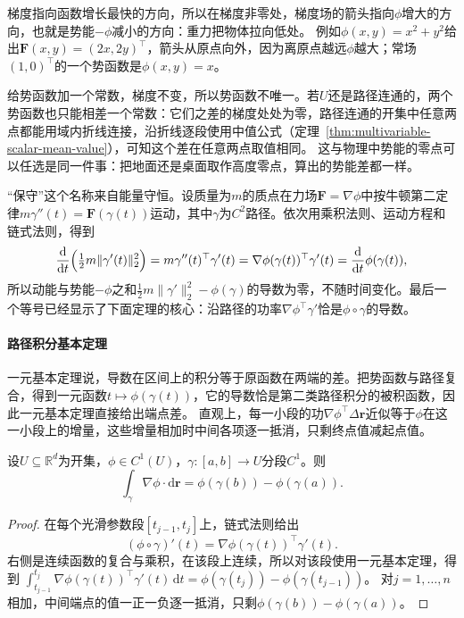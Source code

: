 梯度指向函数增长最快的方向，所以在梯度非零处，梯度场的箭头指向$\phi$增大的方向，也就是势能$-\phi$减小的方向：重力把物体拉向低处。
例如$\phi(x,y)=x^2+y^2$给出$\bm F(x,y)=(2x,2y)^\top$，箭头从原点向外，因为离原点越远$\phi$越大；常场$(1,0)^\top$的一个势函数是$\phi(x,y)=x$。

给势函数加一个常数，梯度不变，所以势函数不唯一。若$U$还是路径连通的，两个势函数也只能相差一个常数：它们之差的梯度处处为零，路径连通的开集中任意两点都能用域内折线连接，沿折线逐段使用中值公式（定理~\ref{thm:multivariable-scalar-mean-value}），可知这个差在任意两点取值相同。
这与物理中势能的零点可以任选是同一件事：把地面还是桌面取作高度零点，算出的势能差都一样。

“保守”这个名称来自能量守恒。设质量为$m$的质点在力场$\bm F=\nabla\phi$中按牛顿第二定律$m\gamma''(t)=\bm F(\gamma(t))$运动，其中$\gamma$为$C^2$路径。依次用乘积法则、运动方程和链式法则，得到
\[
 \frac{\mathrm d}{\mathrm dt}\Bigl(\tfrac12m\lVert\gamma'(t)\rVert_2^2\Bigr)
 =m\gamma''(t)^\top\gamma'(t)=\nabla\phi(\gamma(t))^\top\gamma'(t)
 =\frac{\mathrm d}{\mathrm dt}\phi(\gamma(t)),
\]
所以动能与势能$-\phi$之和$\frac12m\lVert\gamma'\rVert_2^2-\phi(\gamma)$的导数为零，不随时间变化。最后一个等号已经显示了下面定理的核心：沿路径的功率$\nabla\phi^\top\gamma'$恰是$\phi\circ\gamma$的导数。

\paragraph{路径积分基本定理}

一元基本定理说，导数在区间上的积分等于原函数在两端的差。把势函数与路径复合，得到一元函数$t\mapsto\phi(\gamma(t))$，它的导数恰是第二类路径积分的被积函数，因此一元基本定理直接给出端点差。
直观上，每一小段的功$\nabla\phi^\top\Delta\bm r$近似等于$\phi$在这一小段上的增量，这些增量相加时中间各项逐一抵消，只剩终点值减起点值。
\begin{theorem}[路径积分基本定理]
设$U\subseteq\mathbb R^d$为开集，$\phi\in C^1(U)$，$\gamma:[a,b]\to U$分段$C^1$。则
\begin{equation}
  \int_{\gamma}\nabla\phi\mathbin{\cdot}\mathrm{d}\bm{r}
  =\phi(\gamma(b))-\phi(\gamma(a)).
\label{eq:analysis-line-integral-gradient}
\end{equation}
\end{theorem}
\begin{proof}
在每个光滑参数段$[t_{j-1},t_j]$上，链式法则给出
\[
 (\phi\circ\gamma)'(t)=\nabla\phi(\gamma(t))^\top\gamma'(t).
\]
右侧是连续函数的复合与乘积，在该段上连续，所以对该段使用一元基本定理，得到
$\int_{t_{j-1}}^{t_j}\nabla\phi(\gamma(t))^\top\gamma'(t)\,\mathrm dt=\phi(\gamma(t_j))-\phi(\gamma(t_{j-1}))$。
对$j=1,\dots,n$相加，中间端点的值一正一负逐一抵消，只剩$\phi(\gamma(b))-\phi(\gamma(a))$。
\end{proof}

